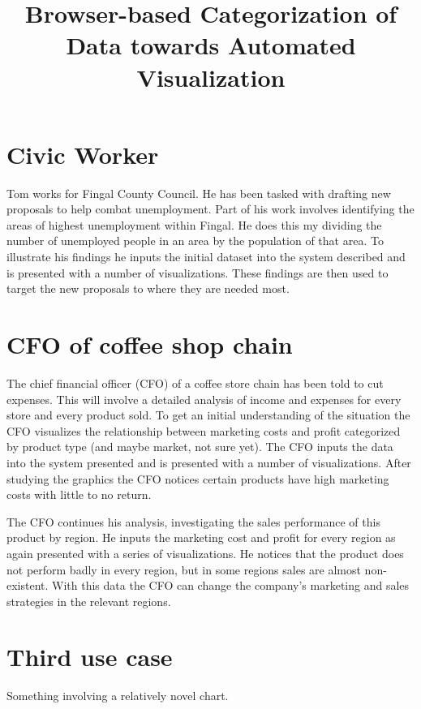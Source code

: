 \documentclass[12pt]{article}
\begin{document}
\title{Browser-based Categorization of Data towards Automated Visualization}

\maketitle







\section*{Civic Worker}
Tom works for Fingal County Council. He has been tasked with drafting new proposals to help combat unemployment. Part of his work involves identifying the areas of highest unemployment within Fingal. He does this my dividing the number of unemployed people in an area by the population of that area. To illustrate his findings he inputs the initial dataset into the system described and is presented with a number of visualizations. These findings are then used to target the new proposals to where they are needed most.

\section*{CFO of coffee shop chain}  
The chief financial officer (CFO) of a coffee store chain has been told to cut expenses. This will involve a detailed analysis of income and expenses for every store and every product sold. To get an initial understanding of the situation the CFO visualizes the relationship between marketing costs and profit categorized by product type (and maybe market, not sure yet). The CFO inputs the data into the system presented and is presented with a number of visualizations. After studying the graphics the CFO notices certain products have high marketing costs with little to no return.

The CFO continues his analysis, investigating the sales performance of this product by region. He inputs the marketing cost and profit  for every region as again presented with a series of visualizations. He notices that the product does not perform badly in every region, but in some regions sales are almost non-existent. With this data the CFO can change the company's marketing and sales strategies in the relevant regions.

\section*{Third use case}
Something involving a relatively novel chart.
\end{document}
